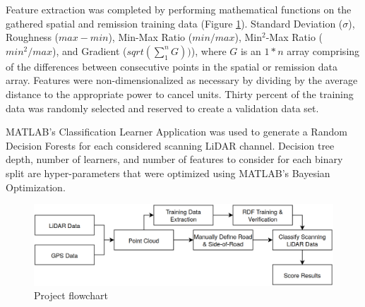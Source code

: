 \documentclass[journal,onecolumn]{IEEEtran}
\begin{document}


	{Feature extraction was completed by performing mathematical functions on the gathered spatial and remission training data (Figure \ref{fig:flowzchart}). Standard Deviation ($\sigma$), Roughness ($max - min$), Min-Max Ratio ($min / max$), Min$^{2}$-Max Ratio ($min^2 / max$), and Gradient ($sqrt(\sum_{1}^{n} G))$), where $G$ is an $1*n$ array comprising of the differences between consecutive points in the spatial or remission data array. Features were non-dimensionalized as necessary by dividing by the average distance to the appropriate power to cancel units. Thirty percent of the training data was randomly selected and reserved to create a validation data set.} 
	
	{MATLAB's Classification Learner Application was used to generate a Random Decision Forests for each considered scanning LiDAR channel. Decision tree depth, number of learners, and number of features to consider for each binary split are hyper-parameters that were optimized using MATLAB's Bayesian Optimization.}
	
	\begin{figure}
		\centering
		\includegraphics[width=0.9\linewidth]{figures/flowz}
		\caption[Project Flow]{Project flowchart}
		\label{fig:flowzchart}
	\end{figure}
\end{document}
